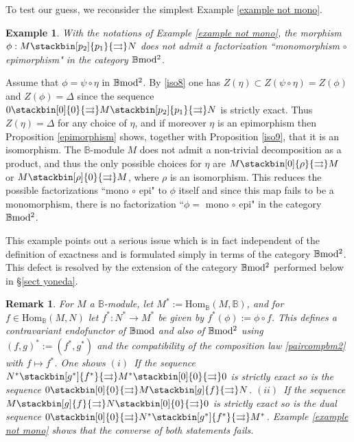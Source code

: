 \documentclass[12pt]{article}
\newtheorem{rem}[thm]{Remark}
\newtheorem{example}[thm]{Example}
\def\Hom{{\rm Hom}}
\def\B{{\mathbb B}}
\def\strgly{strictly }
\def\Hom {{\mbox{Hom}}}
\def\bmod{{\rm \B mod}}
\def\bm2{{\rm \B mod^2}}
\begin{document}
 To test our guess, we reconsider the simplest Example \ref{example not mono}. 
 \begin{example} \label{notmonoepi}
 With the notations of Example \ref{example not mono}, the morphism $\phi:M \stackbin[p_2]{p_1}{\rightrightarrows}N$  does not admit a factorization ``monomorphism $\circ$ epimorphism" in the category $\bm2$. 	
   \end{example}
\proof Assume that $\phi= \psi\circ \eta$ in $\bm2$. By \eqref{iso8} one has  $Z(\eta)\subset Z(\psi\circ \eta)=Z(\phi)$ and $Z(\phi)=\Delta$ since the sequence $0 \stackbin[0]{0}{\rightrightarrows}M\stackbin[p_2]{p_1}{\rightrightarrows}N$ is \strgly exact. Thus $Z(\eta)=\Delta$ for any choice of $\eta$, and if moreover $\eta$ is an epimorphism then Proposition \ref{epimorphism} shows, together with Proposition \ref{iso9}, that it is an isomorphism.   The $\B$-module $M$ does not admit a non-trivial decomposition as a product, and thus the only possible choices for $\eta$ are $M \stackbin[0]{\rho}{\rightrightarrows}M$ or $M \stackbin[\rho]{0}{\rightrightarrows}M$, where $\rho$ is an isomorphism. This reduces the possible factorizations ``mono $\circ$ epi" to $\phi$ itself and since this map fails to be  a monomorphism, there is no factorization ``$\phi=$ mono $\circ$ epi" in the category $\bm2$. \endproof

This example points out a serious issue which is in fact independent of the definition of exactness and is formulated simply in terms of the category $\bm2$. This defect is resolved by the extension of the category $\bm2$ performed below in \S \ref{sect yoneda}.
\begin{rem}\label{hom functors} For $M$ a $\B$-module, let $M^*:=\Hom_\B(M,\B)$, and for $f\in \Hom_\B(M,N)$ let $f^*:N^*\to M^*$ be given by $f^*(\phi):=\phi\circ f$. This defines a contravariant endofunctor of $\bmod$ and also of $\bm2$ using $(f,g)^*:=(f^*,g^*)$ and the compatibility of the composition law \eqref{paircompbm2} with $f \mapsto f^*$. One shows 
\newline
  $(i)$~If the sequence 
  $N^*\stackbin[g^*]{f^*}{\rightrightarrows}M^*\stackbin[0]{0}{\rightrightarrows}0$ is  \strgly exact so is the sequence $0 \stackbin[0]{0}{\rightrightarrows}M\stackbin[g]{f}{\rightrightarrows}N$.\newline
  $(ii)$~If the sequence 
 $M\stackbin[g]{f}{\rightrightarrows}N\stackbin[0]{0}{\rightrightarrows}0$ is \strgly exact so is the dual sequence $0\stackbin[0]{0}{\rightrightarrows}N^*\stackbin[g^*]{f^*}{\rightrightarrows}M^*$.\newline
	Example \ref{example not mono} shows that the converse of both statements fails.
\end{rem}
\end{document}

